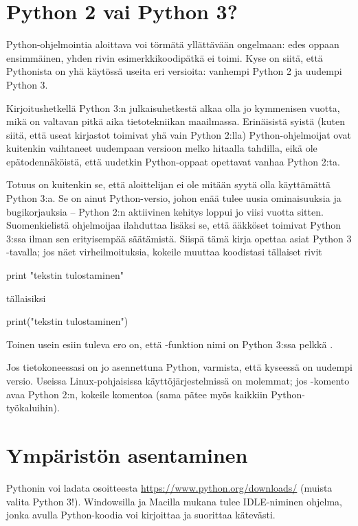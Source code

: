 \section{Python 2 vai Python 3?}

Python-ohjelmointia aloittava voi törmätä yllättävään ongelmaan: edes oppaan ensimmäinen, yhden rivin esimerkkikoodipätkä ei toimi. Kyse on siitä, että Pythonista on yhä käytössä useita eri versioita: vanhempi Python 2 ja uudempi Python 3.

Kirjoitushetkellä Python 3:n julkaisuhetkestä alkaa olla jo kymmenisen vuotta, mikä on valtavan pitkä aika tietotekniikan maailmassa. Erinäisistä syistä (kuten siitä, että useat kirjastot toimivat yhä vain Python 2:lla) Python-ohjelmoijat ovat kuitenkin vaihtaneet uudempaan versioon melko hitaalla tahdilla, eikä ole epätodennäköistä, että uudetkin Python-oppaat opettavat vanhaa Python 2:ta.

Totuus on kuitenkin se, että aloittelijan ei ole mitään syytä olla käyttämättä Python 3:a. Se on ainut Python-versio, johon enää tulee uusia ominaisuuksia ja bugikorjauksia -- Python 2:n aktiivinen kehitys loppui jo viisi vuotta sitten. Suomenkielistä ohjelmoijaa ilahduttaa lisäksi se, että ääkköset toimivat Python 3:ssa ilman sen erityisempää säätämistä. Siispä tämä kirja opettaa asiat Python 3 -tavalla; jos näet virheilmoituksia, kokeile muuttaa koodistasi tällaiset rivit

\begin{python}
print "tekstin tulostaminen"
\end{python}

tällaisiksi

\begin{python}
print("tekstin tulostaminen")
\end{python}

Toinen usein esiin tuleva ero on, että -funktion nimi on Python 3:ssa pelkkä .

Jos tietokoneessasi on jo asennettuna Python, varmista, että kyseessä on uudempi versio. Useissa Linux-pohjaisissa käyttöjärjestelmissä on molemmat; jos -komento avaa Python 2:n, kokeile komentoa  (sama pätee myös kaikkiin Python-työkaluihin).

\section{Ympäristön asentaminen}

Pythonin voi ladata osoitteesta \url{https://www.python.org/downloads/} (muista valita Python 3!). Windowsilla ja Macilla mukana tulee IDLE-niminen ohjelma, jonka avulla Python-koodia voi kirjoittaa ja suorittaa kätevästi.


